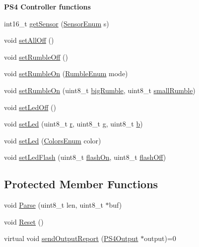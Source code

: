 \begin{Indent}{\bf \-P\-S4 \-Controller functions}
\begin{DoxyCompactItemize}
\item 
int16\-\_\-t \hyperlink{class_p_s4_parser_a2b06200adee0c8ed616c4d18c23a584a}{get\-Sensor} (\hyperlink{controller_enums_8h_a00d5030559c481763282483889597d51}{\-Sensor\-Enum} s)
\item 
void \hyperlink{class_p_s4_parser_adf2b7f2888fb7ebc9c58595a85568d65}{set\-All\-Off} ()
\item 
void \hyperlink{class_p_s4_parser_acc9b3be8fb673e8e1f637c56d72f1180}{set\-Rumble\-Off} ()
\item 
void \hyperlink{class_p_s4_parser_a44628a8521ef9c19d773347156962cab}{set\-Rumble\-On} (\hyperlink{controller_enums_8h_ab195293384292950ebc2166bfe360fd1}{\-Rumble\-Enum} mode)
\item 
void \hyperlink{class_p_s4_parser_a8299bdbb9d790e6b2e98e942e9bd154e}{set\-Rumble\-On} (uint8\-\_\-t \hyperlink{_p_s4_parser_8h_af293beb2bff1b47c0fb060411dd68b0f}{big\-Rumble}, uint8\-\_\-t \hyperlink{_p_s4_parser_8h_a9a2c63b6ac73cde8ded7e2b90460cdcc}{small\-Rumble})
\item 
void \hyperlink{class_p_s4_parser_a820f1caf266224d1c1bb83b550ef4c97}{set\-Led\-Off} ()
\item 
void \hyperlink{class_p_s4_parser_a3f709524b0303086591d81bd238e62e8}{set\-Led} (uint8\-\_\-t \hyperlink{_p_s4_parser_8h_a4c5c6ceb8ed33456261fa907136e0c3a}{r}, uint8\-\_\-t \hyperlink{_p_s4_parser_8h_a1673907d4d89d763bb7b94ec1eeb7b60}{g}, uint8\-\_\-t \hyperlink{_p_s4_parser_8h_a4313c9563516f94387762ab05763456b}{b})
\item 
void \hyperlink{class_p_s4_parser_a58e7a4746ee4e1fc5ceea44f64ffc3f2}{set\-Led} (\hyperlink{controller_enums_8h_aac6fa7b0395b95cc528deaad0ce884a2}{\-Colors\-Enum} color)
\item 
void \hyperlink{class_p_s4_parser_a26342dea530bf09e2ac8df847c1874fc}{set\-Led\-Flash} (uint8\-\_\-t \hyperlink{_p_s4_parser_8h_a7d332ba0c3474500fdc43e1f04cedc0e}{flash\-On}, uint8\-\_\-t \hyperlink{_p_s4_parser_8h_a2a0da35e9b74068cfe3a5d1ce6a035f4}{flash\-Off})
\end{DoxyCompactItemize}
\end{Indent}
\subsection*{\-Protected \-Member \-Functions}
\begin{DoxyCompactItemize}
\item 
void \hyperlink{class_p_s4_parser_a6498fdeb767364e84ce09ef208980622}{\-Parse} (uint8\-\_\-t len, uint8\-\_\-t $\ast$buf)
\item 
void \hyperlink{class_p_s4_parser_a24640b2362b0f6f51785fbd3dd4f13f9}{\-Reset} ()
\item 
virtual void \hyperlink{class_p_s4_parser_a8788530b0c213dedfcf56b78e8ca4879}{send\-Output\-Report} (\hyperlink{struct_p_s4_output}{\-P\-S4\-Output} $\ast$output)=0
\end{DoxyCompactItemize}


